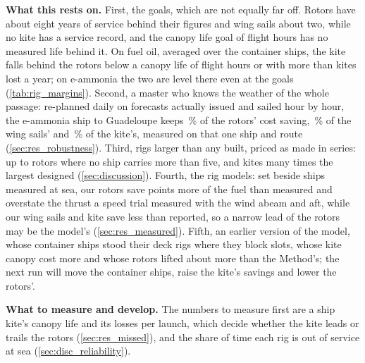 \textbf{What this rests on.} First, the goals, which are not equally far off. Rotors have about eight years of service behind their figures and wing sails about two, while no kite has a service record, and the canopy life goal of \NumCanopyLifeGoal{} flight hours has no measured life behind it. On fuel oil, averaged over the container ships, the kite falls behind the rotors below a canopy life of \NumKiteLifeLimitOilContainer{} flight hours or with more than \NumKiteLossLimitOilContainer{} kites lost a year; on e-ammonia the two are level there even at the goals (\cref{tab:rig_margins}). Second, a master who knows the weather of the whole passage: re-planned daily on forecasts actually issued and sailed hour by hour, the  e-ammonia ship to Guadeloupe keeps \NumForecastKeptRotors\,\% of the rotors' cost saving, \NumForecastKeptWings\,\% of the wing sails' and \NumForecastKeptKite\,\% of the kite's, measured on that one ship and route (\cref{sec:res_robustness}). Third, rigs larger than any built, priced as made in series: up to \NumMostUnitsRotors{} rotors where no ship carries more than five, and kites many times the largest designed (\cref{sec:discussion}).  Fourth, the rig models: set beside ships measured at sea, our rotors save \NumMeasuredRotorGap{} points more of the fuel than measured and overstate the thrust a speed trial measured with the wind abeam and aft, while our wing sails and kite save less than reported, so a narrow lead of the rotors may be the model's (\cref{sec:res_measured}). Fifth, an earlier version of the model, whose container ships stood their deck rigs where they block slots, whose kite canopy cost more and whose rotors lifted about  more than the Method's; the next run will move the container ships, raise the kite's savings and lower the rotors'.

\textbf{What to measure and develop.} The numbers to measure first are a ship kite's canopy life and its losses per launch, which decide whether the kite leads or trails the rotors (\cref{sec:res_missed}), and the share of time each rig is out of service at sea (\cref{sec:disc_reliability}). 
